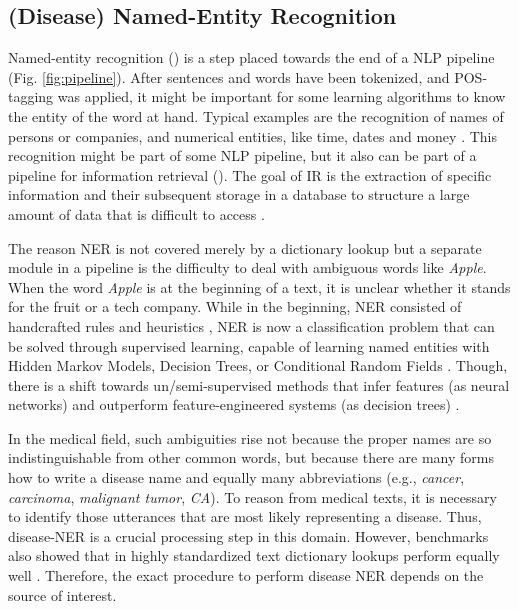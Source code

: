 \subsection{(Disease) Named-Entity Recognition}
  Named-entity recognition () is a step placed towards the end of a NLP pipeline (Fig. \ref{fig:pipeline}).
  After sentences and words have been tokenized, and POS-tagging was applied, it might be important for some learning algorithms to know the entity of the word at hand.
  Typical examples are the recognition of names of persons or companies, and numerical entities, like time, dates and money \citep{Nadeau2009}.
  This recognition might be part of some NLP pipeline, but it also can be part of a pipeline for information retrieval ().
  The goal of IR is the extraction of specific information and their subsequent storage in a database to structure a large amount of data that is difficult to access \citep{Manning2008, Wei2011}.

  The reason NER is not covered merely by a dictionary lookup but a separate module in a pipeline is the difficulty to deal with ambiguous words like \textit{Apple}.
  When the word \textit{Apple} is at the beginning of a text, it is unclear whether it stands for the fruit or a tech company.
  While in the beginning, NER consisted of handcrafted rules and heuristics \citep{Rau1991}, NER is now a classification problem that can be solved through supervised learning, capable of learning named entities with Hidden Markov Models, Decision Trees, or Conditional Random Fields \citep{Nadeau2009}.
  Though, there is a shift towards un/semi-supervised methods that infer features (as neural networks) and outperform feature-engineered systems (as decision trees) \citep{Yadav2018}.

  In the medical field, such ambiguities rise not because the proper names are so indistinguishable from other common words, but because there are many forms how to write a disease name and equally many abbreviations (e.g., \textit{cancer}, \textit{carcinoma}, \textit{malignant tumor}, \textit{CA}).
  To reason from medical texts, it is necessary to identify those utterances that are most likely representing a disease.
  Thus, disease-NER is a crucial processing step in this domain.
  However, benchmarks also showed that in highly standardized text dictionary lookups perform equally well \citep{Jimeno2007}.
  Therefore, the exact procedure to perform disease NER depends on the source of interest.

